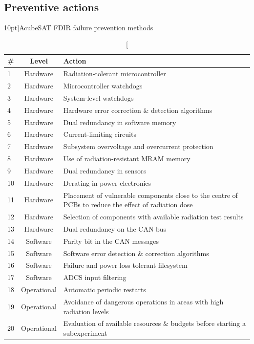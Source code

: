 \documentclass[a4paper,nobib,final]{tufte-book}
\begin{document}
\clearpage
\subsection{Preventive actions}

\begin{table}[h]
	\centering
	\caption[][10pt]{AcubeSAT \acs{FDIR} failure prevention methods}
	\label{tab:fdir_preventive}
	\renewcommand{\arraystretch}{1.5}
	\begin{tabularx}{\textwidth}{@{}lcX@{}}
		\toprule
		\# & Level & Action \\ \midrule
		1 & Hardware & Radiation-tolerant microcontroller \\
		2 & Hardware & Microcontroller watchdogs \parencite{beningo_review_watchdog_2010} \\
		3 & Hardware & System-level watchdogs \\
		4 & Hardware & Hardware error correction \& detection algorithms \\
		5 & Hardware & Dual redundancy in software memory \\
		6 & Hardware & Current-limiting circuits \\
		7 & Hardware & Subsystem overvoltage and overcurrent protection \\
		8 & Hardware & Use of radiation-resistant \acs{MRAM} memory \\
		9 & Hardware & Dual redundancy in sensors \\
		10 & Hardware & Derating in power electronics \\
		11 & Hardware & Placement of vulnerable components close to the centre of \acsp{PCB} to reduce the effect of radiation dose \\
		12 & Hardware & Selection of components with available radiation test results \\
		13 & Hardware & Dual redundancy on the \acs{CAN} bus \\
		14 & Software & Parity bit in the \acs{CAN} messages \\
		15 & Software & Software error detection \& correction algorithms \\
		16 & Software & Failure and power loss tolerant filesystem \\
		17 & Software & \acs{ADCS} input filtering \\
		18 & Operational & Automatic periodic restarts \\
		19 & Operational & Avoidance of dangerous operations in areas with high radiation levels \\
		20 & Operational & Evaluation of available resources \& budgets before starting a subexperiment \\ \bottomrule
	\end{tabularx}
\end{table}
\end{document}
